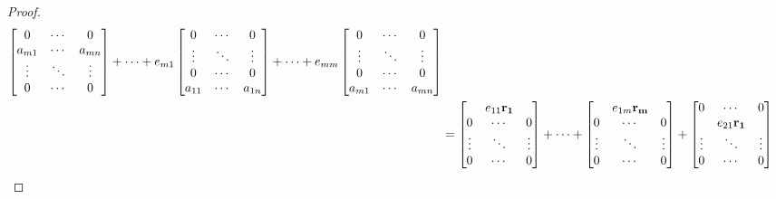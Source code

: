 \documentclass[../main.tex]{subfiles}
\begin{document}
\begin{proof}
\begin{align*}
\begin{bmatrix}
			                                 0      & \cdots & 0      \\
			                                 a_{m1} & \cdots & a_{mn} \\
			                                 \vdots & \ddots & \vdots \\
			                                 0      & \cdots & 0
		                                 \end{bmatrix}+\cdots+
		e_{m1}\begin{bmatrix}
			      0      & \cdots & 0      \\
			      \vdots & \ddots & \vdots \\
			      0      & \cdots & 0      \\
			      a_{11} & \cdots & a_{1n}
		      \end{bmatrix}+\cdots+
		e_{mm}\begin{bmatrix}
			      0      & \cdots & 0      \\
			      \vdots & \ddots & \vdots \\
			      0      & \cdots & 0      \\
			      a_{m1} & \cdots & a_{mn}
		      \end{bmatrix}                                                                    \\
		                 & =\begin{bmatrix}
			                           & e_{11}\mathbf{r_1} &        \\
			                    0      & \cdots           & 0      \\
			                    \vdots & \ddots           & \vdots \\
			                    0      & \cdots           & 0
		                    \end{bmatrix}+\cdots+
		\begin{bmatrix}
			       & e_{1m}\mathbf{r_m} &        \\
			0      & \cdots           & 0      \\
			\vdots & \ddots           & \vdots \\
			0      & \cdots           & 0
		\end{bmatrix}+
		\begin{bmatrix}
			0      & \cdots           & 0      \\
			       & e_{21}\mathbf{r_1} &        \\
			\vdots & \ddots           & \vdots \\
			0      & \cdots           & 0

\end{bmatrix}
\end{align*}
\end{proof}
\end{document}
